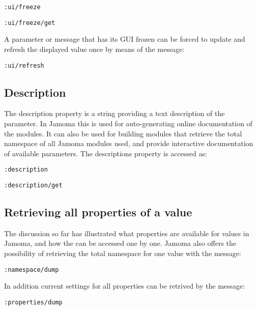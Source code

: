 \documentclass{sig-alternate}
\begin{document}
\texttt{:ui/freeze}

\texttt{:ui/freeze/get}

A parameter or message that has its GUI frozen can be forced to update and refresh the displayed value once by means of the message:

\texttt{:ui/refresh}






\subsection{Description} %
\label{sub:description}

The description property is a string providing a text description of the parameter. In Jamoma this is used for auto-generating online documentation of the modules. It can also be used for building modules that retrieve the total namespace of all Jamoma modules used, and provide interactive documentation of available parameters. The descriptions property is accessed as:

\texttt{:description}

\texttt{:description/get}





\subsection{Retrieving all properties of a value} %
\label{sub:retrieving_all_properties_of_a_value}

The discussion so far has illustrated what properties are available for values in Jamoma, and how the can be accessed one by one. Jamoma also offers the possibility of retrieving the total namespace for one value with the message: 

\texttt{:namespace/dump}

In addition current settings for all properties can be retrived by the message:

\texttt{:properties/dump}


\end{document}
